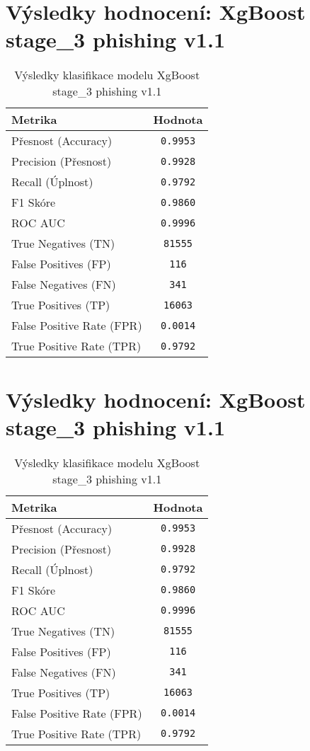 \section*{Výsledky hodnocení: XgBoost stage_3 phishing v1.1}
\begin{table}[h!]
\centering
\begin{tabular}{|l|c|}
\hline
\textbf{Metrika} & \textbf{Hodnota} \\
\hline
Přesnost (Accuracy) & \texttt{0.9953} \\
Precision (Přesnost) & \texttt{0.9928} \\
Recall (Úplnost) & \texttt{0.9792} \\
F1 Skóre & \texttt{0.9860} \\
ROC AUC & \texttt{0.9996} \\
True Negatives (TN) & \texttt{81555} \\
False Positives (FP) & \texttt{116} \\
False Negatives (FN) & \texttt{341} \\
True Positives (TP) & \texttt{16063} \\
False Positive Rate (FPR) & \texttt{0.0014} \\
True Positive Rate (TPR) & \texttt{0.9792} \\
\hline
\end{tabular}
\caption{Výsledky klasifikace modelu XgBoost stage_3 phishing v1.1}
\label{tab:phishing_xgboost}
\end{table}

\section*{Výsledky hodnocení: XgBoost stage_3 phishing v1.1}
\begin{table}[h!]
\centering
\begin{tabular}{|l|c|}
\hline
\textbf{Metrika} & \textbf{Hodnota} \\
\hline
Přesnost (Accuracy) & \texttt{0.9953} \\
Precision (Přesnost) & \texttt{0.9928} \\
Recall (Úplnost) & \texttt{0.9792} \\
F1 Skóre & \texttt{0.9860} \\
ROC AUC & \texttt{0.9996} \\
True Negatives (TN) & \texttt{81555} \\
False Positives (FP) & \texttt{116} \\
False Negatives (FN) & \texttt{341} \\
True Positives (TP) & \texttt{16063} \\
False Positive Rate (FPR) & \texttt{0.0014} \\
True Positive Rate (TPR) & \texttt{0.9792} \\
\hline
\end{tabular}
\caption{Výsledky klasifikace modelu XgBoost stage_3 phishing v1.1}
\label{tab:phishing_xgboost}
\end{table}


